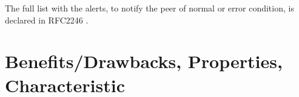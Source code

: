 The full list with the alerts, to notify the peer of normal or error condition, is declared in RFC2246 \cite{rfc2246}. \cite{W.Stalling} \cite{ms:overview}

\section{Benefits/Drawbacks, Properties, Characteristic}
\label{sec:introduction_suggestions}



